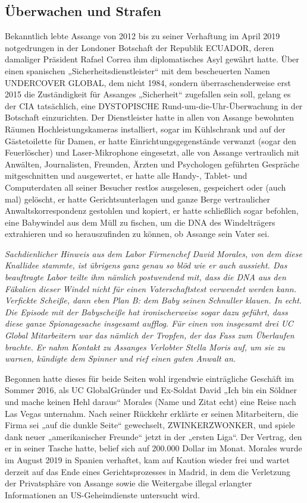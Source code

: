 \begin{multicols}{2}
\chapter{Überwachen und Strafen} 
Bekanntlich lebte Assange von 2012 bis zu seiner Verhaftung im April 2019 notgedrungen in der Londoner
Botschaft der Republik ECUADOR, deren damaliger Präsident Rafael Correa ihm diplomatisches Asyl gewährt
hatte. Über einen spanischen „Sicherheitsdienstleister“
mit dem bescheuerten Namen UNDERCOVER GLOBAL,
dem nicht 1984, sondern überraschenderweise erst 2015
die Zuständigkeit für Assanges „Sicherheit“ zugefallen
sein soll, gelang es der CIA tatsächlich, eine DYSTOPISCHE Rund-um-die-Uhr-Überwachung in der Botschaft
einzurichten. Der Dienstleister hatte in allen von Assange bewohnten Räumen Hochleistungskameras installiert, sogar im Kühlschrank und auf der Gästetoilette
für Damen, er hatte Einrichtungsgegenstände verwanzt
(sogar den Feuerlöscher) und Laser-Mikrophone eingesetzt, alle von Assange vertraulich mit Anwälten, Journalisten, Freunden, Ärzten und Psychologen geführten
Gespräche mitgeschnitten und ausgewertet, er hatte
alle Handy-, Tablet- und Computerdaten all seiner Besucher restlos ausgelesen, gespeichert oder (auch mal)
gelöscht, er hatte Gerichtsunterlagen und ganze Berge
vertraulicher Anwaltskorrespondenz gestohlen und kopiert, er hatte schließlich sogar befohlen, eine Babywindel aus dem Müll zu fischen, um die DNA des Windelträgers extrahieren und so herauszufinden zu können, ob
Assange sein Vater sei.

\textit{Sachdienlicher Hinweis aus dem Labor \linebreak
Firmenchef David Morales, von dem diese Knallidee
stammte, ist übrigens ganz genau so blöd wie er auch aussieht. Das beauftragte Labor teilte ihm nämlich postwendend mit, dass die DNA aus den Fäkalien dieser Windel
nicht für einen Vaterschaftstest verwendet werden kann.
Verfickte Scheiße, dann eben Plan B: dem Baby seinen
Schnuller klauen. In echt. Die Episode mit der Babyscheiße hat ironischerweise sogar dazu geführt, dass diese ganze Spionagesache insgesamt aufflog. Für einen von insgesamt drei UC Global Mitarbeitern war das nämlich der
Tropfen, der das Fass zum Überlaufen brachte. Er nahm
Kontakt zu Assanges Verlobter Stella Moris auf, um sie zu
warnen, kündigte dem Spinner und rief einen guten Anwalt an.}

Begonnen hatte dieses für beide Seiten wohl irgendwie
einträgliche Geschäft im Sommer 2016, als UC GlobalGründer und Ex-Soldat David „Ich bin ein Söldner und
mache keinen Hehl daraus“ Morales (Name und Zitat
echt) eine Reise nach Las Vegas unternahm. Nach seiner
Rückkehr erklärte er seinen Mitarbeitern, die Firma sei
„auf die dunkle Seite“ gewechselt, ZWINKERZWONKER,
und spiele dank neuer „amerikanischer Freunde“ jetzt
in der „ersten Liga“. Der Vertrag, den er in seiner Tasche
hatte, belief sich auf 200.000 Dollar im Monat. Morales
wurde im August 2019 in Spanien verhaftet, kam auf
Kaution wieder frei und wartet derzeit auf das Ende eines Gerichtsprozesses in Madrid, in dem die Verletzung
der Privatsphäre von Assange sowie die Weitergabe illegal erlangter Informationen an US-Geheimdienste untersucht wird.


\end{multicols}
